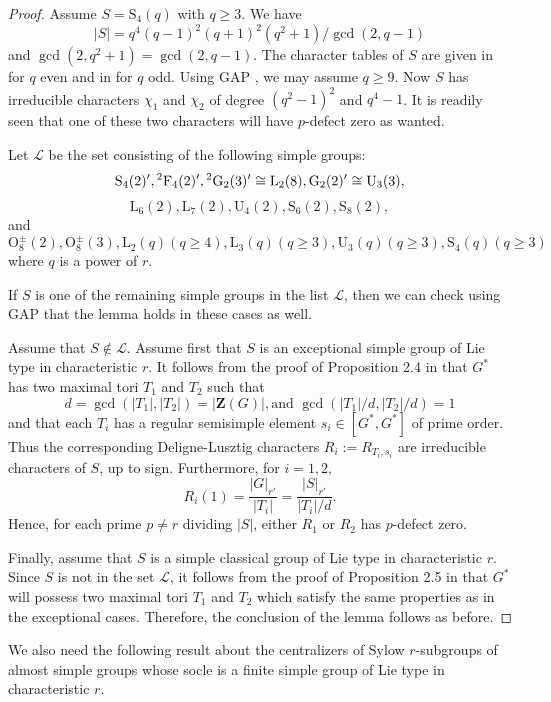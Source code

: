 \documentclass[twoside,a4paper,reqno,12pt]{amsart}
\newcommand{\<}{\langle}
\renewcommand{\>}{\rangle}
\newcommand{\geqs}{\geqslant}
\newcommand{\PSU}{\mathrm {U}}
\newcommand{\PSL}{\mathrm {L}}
\newcommand{\PSp}{\mathrm {S}}
\newcommand{\PSO}{\mathrm {O}}
\newcommand{\ZB}{\mathbf{Z}}
\renewcommand{\geq}{\geqs}
\renewcommand{\:}{\colon}
\theoremstyle{definition}
\begin{document}
\begin{proof}
 Assume $S=\PSp_4(q)$ with $q\ge 3.$ We have $$|S|=q^4(q-1)^2(q+1)^2(q^2+1)/\gcd(2,q-1)$$ and $\gcd(2,q^2+1)=\gcd(2,q-1).$
 The character tables of $S$ are given in \cite{Enomoto} for $q$ even and in \cite{Srinivasan} for $q$ odd.  Using GAP \cite{GAP}, we may assume $q\ge 9$. Now $S$ has irreducible characters $\chi_1$ and $\chi_2$ of degree $(q^2-1)^2$ and $q^4-1$. It is readily seen that one of these two characters will have $p$-defect zero as wanted.
 
 
  
  Let $\mathcal{L}$ be the set consisting of the following simple groups: $$\PSp_4(2)',{}^2{\rm F}_4(2)',{}^2{\rm G}_2(3)'\cong \PSL_2(8),{\rm G}_2(2)'\cong \PSU_3(3),$$ $$\PSL_6(2),\PSL_7(2),\PSU_4(2),\PSp_6(2),\PSp_8(2),$$ and \[\PSO_8^\pm(2),\PSO_8^\pm(3),\PSL_2(q) (q\ge 4),\PSL_3(q) (q\geq 3),\PSU_3(q)(q\geq 3), \PSp_4(q) (q\ge 3)\] where $q$ is a power of $r.$

 If $S$ is one of the remaining  simple groups in the list $\mathcal{L}$, then we can check using GAP \cite{GAP} that the lemma holds in these cases as well.
 
 Assume that $S\not\in \mathcal{L}$.   Assume first that $S$ is an exceptional simple group of Lie type in characteristic $r$.
 It follows from the proof of Proposition 2.4 in \cite{Malle} that $G^*$ has two maximal tori $T_1$ and $T_2$ such that $$d=\gcd(|T_1|,|T_2|)=|\ZB(G)|, \text{and } \gcd(|T_1|/d,|T_2|/d)=1$$ and that each $T_i$ has a regular semisimple element $s_i\in [G^*,G^*]$ of prime order. Thus the corresponding Deligne-Lusztig characters $R_i:=R_{T_i,s_i}$ are irreducible characters of $S$, up to sign. Furthermore, for $i=1,2,$ $$R_i(1)=\frac{|G|_{r'}}{|T_i|}=\frac{|S|_{r'}}{|T_i|/d}.$$ Hence, for each prime $p\neq r$ dividing $ |S|$, either $R_1$ or $R_2$ has $p$-defect zero.
 
  
 
 Finally, assume that $S$ is a simple classical group of Lie type in characteristic $r$. Since $S$ is not in the set $\mathcal{L}$, it follows from the proof of Proposition 2.5 in \cite{Malle} that $G^*$ will possess two maximal tori $T_1$ and $T_2$ which satisfy the same properties as in the exceptional cases. Therefore, the conclusion of the lemma follows as before.
  \end{proof}

  
 We also need the following result about the centralizers of Sylow $r$-subgroups of almost simple groups whose socle is a finite simple group of Lie type in characteristic $r$.
 
\end{document}
